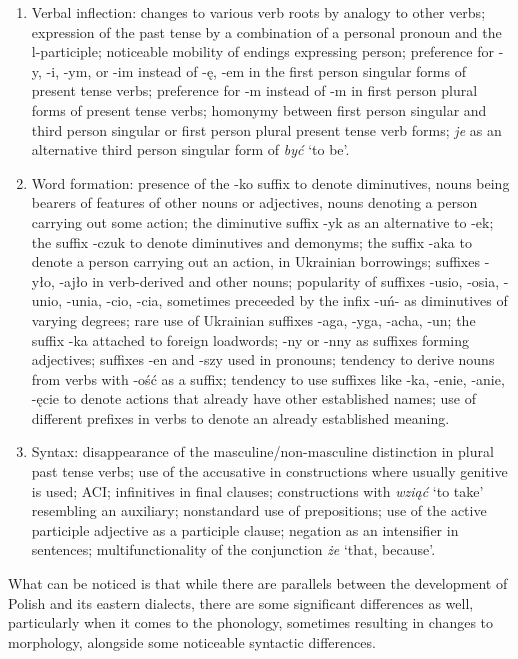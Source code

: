 \begin{enumerate}
    \item Verbal inflection: changes to various verb roots by analogy to other verbs; expression of the past tense by a combination of a personal pronoun and the l-participle; noticeable mobility of endings expressing person; preference for -y, -i, -ym, or -im instead of -ę, -em in the first person singular forms of present tense verbs; preference for -m instead of -m in first person plural forms of present tense verbs; homonymy between first person singular and third person singular or first person plural present tense verb forms; \textit{je} as an alternative third person singular form of \textit{być} `to be'.

    \item Word formation: presence of the -ko suffix to denote diminutives, nouns being bearers of features of other nouns or adjectives, nouns denoting a person carrying out some action; the diminutive suffix -yk as an alternative to -ek; the suffix -czuk to denote diminutives and demonyms; the suffix -aka to denote a person carrying out an action, in Ukrainian borrowings; suffixes -yło, -ajło in verb-derived and other nouns; popularity of suffixes -usio, -osia, -unio, -unia, -cio, -cia, sometimes preceeded by the infix -uń- as diminutives of varying degrees; rare use of Ukrainian suffixes -aga, -yga, -acha, -un; the suffix -ka attached to foreign loadwords; -ny or -nny as suffixes forming adjectives; suffixes -en and -szy used in pronouns; tendency to derive nouns from verbs with -ość as a suffix; tendency to use suffixes like -ka, -enie, -anie, -ęcie to denote actions that already have other established names; use of different prefixes in verbs to denote an already established meaning.

    \item Syntax: disappearance of the masculine/non-masculine distinction in plural past tense verbs; use of the accusative in constructions where usually genitive is used; ACI; infinitives in final clauses; constructions with \textit{wziąć} `to take' resembling an auxiliary; nonstandard use of prepositions; use of the active participle adjective as a participle clause; negation as an intensifier in sentences; multifunctionality of the conjunction \textit{że} `that, because'.
\end{enumerate}

What can be noticed is that while there are parallels between the development of Polish and its eastern dialects, there are some significant differences as well, particularly when it comes to the phonology, sometimes resulting in changes to morphology, alongside some noticeable syntactic differences. 


